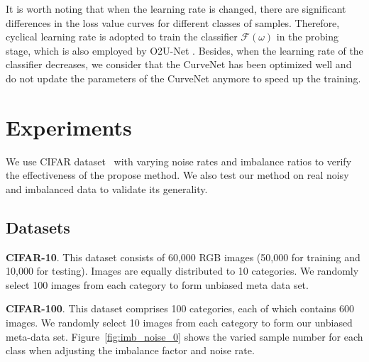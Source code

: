 \documentclass[letterpaper]{article} %
\newcommand{\bd}[1]{\textbf{#1}}
\begin{document}
It is worth noting that when the learning rate is changed, there are significant differences in the loss value curves for different classes of samples.
Therefore, cyclical learning rate \cite{smith2017cyclical} is adopted to train the classifier $\mathcal{F}(\omega)$ in the probing stage, which is also employed by O2U-Net \cite{huang2019o2u}.
Besides, when the learning rate of the classifier decreases, we consider that the CurveNet has been optimized well and do not update the parameters of the CurveNet anymore to speed up the training.

\section{Experiments}
We use CIFAR dataset~\cite{krizhevsky2009learning} with varying noise rates and imbalance ratios to verify the effectiveness of the propose method. We also test our method on real noisy and imbalanced data to validate its generality.

\subsection{Datasets} \label{sec:dataset}

\noindent\bd{CIFAR-10}.
This dataset consists of 60,000 RGB images (50,000 for training and 10,000 for testing). Images are equally distributed to 10 categories.
We randomly select 100 images from each category to form unbiased meta data set.

\noindent\bd{CIFAR-100}. This dataset comprises 100 categories, each of which contains 600 images.
We randomly select 10 images from each category to form our unbiased meta-data set.
Figure~\ref{fig:imb_noise_0} shows the varied sample number for each class when adjusting the imbalance factor and noise rate.
\end{document}
